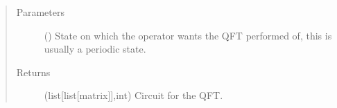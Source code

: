 \documentclass[letterpaper,10pt,english]{sphinxmanual}
\begin{document}
\begin{fulllineitems}
\begin{description}
\end{description}
\begin{quote}\begin{description}
\item[{Parameters}] \leavevmode
{} (\sphinxstyleliteralemphasis{\sphinxupquote{{[}}}\sphinxstyleliteralemphasis{\sphinxupquote{{]}}}) \textendash{} State on which the operator wants the QFT performed 
of, this is usually a periodic state.

\item[{Returns}] \leavevmode
(list{[}list{[}matrix{]}{]},int) \textendash{} Circuit for the QFT.

\end{description}\end{quote}

\end{fulllineitems}

\end{document}
